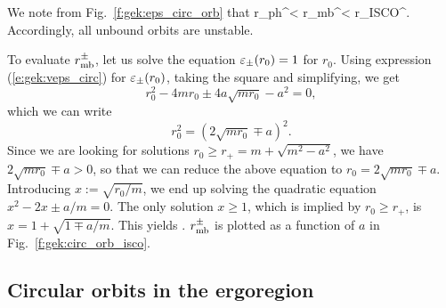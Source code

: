 We note from Fig.~\ref{f:gek:eps_circ_orb} that
\be
    r_{\rm ph}^\pm < r_{\rm mb}^\pm < r_{\rm ISCO}^\pm .
\ee
Accordingly, all unbound orbits are unstable.

To evaluate $r_{\rm mb}^\pm$, let us solve the equation $\varepsilon_\pm(r_0) = 1$ for $r_0$.
Using expression (\ref{e:gek:veps_circ}) for $\varepsilon_\pm(r_0)$, taking the square
and simplifying, we get
\[
    r_0^2 - 4 m r_0 \pm 4 a \sqrt{m r_0} - a^2 = 0 ,
\]
which we can write
\[
    r_0^2 = (2\sqrt{mr_0} \mp a)^2  .
\]
Since we are looking for solutions $r_0 \geq r_+ = m + \sqrt{m^2 - a^2}$, we have
$2\sqrt{m r_0} \mp a > 0$, so that we can reduce the above equation to
$r_0 = 2\sqrt{m r_0} \mp a$. Introducing $x := \sqrt{r_0/m}$, we end up solving
the quadratic equation $x^2 - 2 x \pm a/m = 0$.
The only solution $x \geq 1$, which is implied by $r_0 \geq r_+$, is
$x = 1 + \sqrt{1 \mp a/m}$. This yields
\be \label{e:gek:r_mb_circ}
     .
\ee
$r_{\rm mb}^\pm$ is plotted as a function of $a$ in Fig.~\ref{f:gek:circ_orb_isco}.

\subsection{Circular orbits in the ergoregion}

